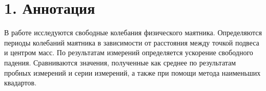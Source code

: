 \section* {1. Аннотация}

    В работе исследуются свободные колебания физического маятника. Определяются периоды колебаний маятника в зависимости от расстояния между точкой подвеса и центром масс. По результатам измерений определяется ускорение свободного падения. Сравниваются значения, полученные как среднее по результатам пробных измерений и серии измерений, а также при помощи метода наименьших квадартов.

